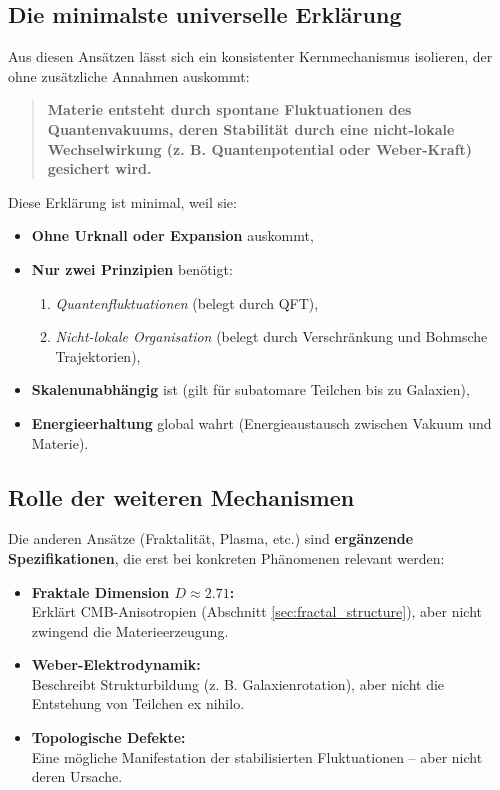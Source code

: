 \subsection{Die minimalste universelle Erklärung}
Aus diesen Ansätzen lässt sich ein konsistenter Kernmechanismus isolieren, der ohne zusätzliche Annahmen auskommt:
\begin{quote}
    \textbf{Materie entsteht durch spontane Fluktuationen des Quantenvakuums, deren Stabilität durch eine nicht-lokale Wechselwirkung (z. B. Quantenpotential oder Weber-Kraft) gesichert wird.}
\end{quote}
Diese Erklärung ist minimal, weil sie:
\begin{itemize}
    \item \textbf{Ohne Urknall oder Expansion} auskommt,
    \item \textbf{Nur zwei Prinzipien} benötigt:
    \begin{enumerate}
        \item \textit{Quantenfluktuationen} (belegt durch QFT),
        \item \textit{Nicht-lokale Organisation} (belegt durch Verschränkung und Bohmsche Trajektorien),
    \end{enumerate}
    \item \textbf{Skalenunabhängig} ist (gilt für subatomare Teilchen bis zu Galaxien),
    \item \textbf{Energieerhaltung} global wahrt (Energieaustausch zwischen Vakuum und Materie).
\end{itemize}

\subsection{Rolle der weiteren Mechanismen}
Die anderen Ansätze (Fraktalität, Plasma, etc.) sind \textbf{ergänzende Spezifikationen}, die erst bei konkreten Phänomenen relevant werden:
\begin{itemize}
    \item \textbf{Fraktale Dimension $D \approx 2.71$:}\\Erklärt CMB-Anisotropien (Abschnitt \ref{sec:fractal_structure}), aber nicht zwingend die Materieerzeugung.
    \item \textbf{Weber-Elektrodynamik:}\\Beschreibt Strukturbildung (z. B. Galaxienrotation), aber nicht die Entstehung von Teilchen ex nihilo.
    \item \textbf{Topologische Defekte:}\\Eine mögliche Manifestation der stabilisierten Fluktuationen – aber nicht deren Ursache.
\end{itemize}
